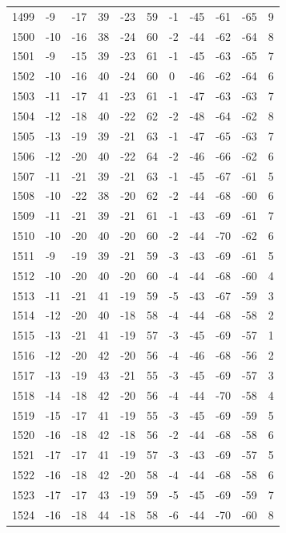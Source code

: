 \begin{table}[H]
\begin{tabular}{lllllllllll}
1499 & -9 & -17 & 39 & -23 & 59 & -1 & -45 & -61 & -65 & 9 \\
1500 & -10 & -16 & 38 & -24 & 60 & -2 & -44 & -62 & -64 & 8 \\
1501 & -9 & -15 & 39 & -23 & 61 & -1 & -45 & -63 & -65 & 7 \\
1502 & -10 & -16 & 40 & -24 & 60 & 0 & -46 & -62 & -64 & 6 \\
1503 & -11 & -17 & 41 & -23 & 61 & -1 & -47 & -63 & -63 & 7 \\
1504 & -12 & -18 & 40 & -22 & 62 & -2 & -48 & -64 & -62 & 8 \\
1505 & -13 & -19 & 39 & -21 & 63 & -1 & -47 & -65 & -63 & 7 \\
1506 & -12 & -20 & 40 & -22 & 64 & -2 & -46 & -66 & -62 & 6 \\
1507 & -11 & -21 & 39 & -21 & 63 & -1 & -45 & -67 & -61 & 5 \\
1508 & -10 & -22 & 38 & -20 & 62 & -2 & -44 & -68 & -60 & 6 \\
1509 & -11 & -21 & 39 & -21 & 61 & -1 & -43 & -69 & -61 & 7 \\
1510 & -10 & -20 & 40 & -20 & 60 & -2 & -44 & -70 & -62 & 6 \\
1511 & -9 & -19 & 39 & -21 & 59 & -3 & -43 & -69 & -61 & 5 \\
1512 & -10 & -20 & 40 & -20 & 60 & -4 & -44 & -68 & -60 & 4 \\
1513 & -11 & -21 & 41 & -19 & 59 & -5 & -43 & -67 & -59 & 3 \\
1514 & -12 & -20 & 40 & -18 & 58 & -4 & -44 & -68 & -58 & 2 \\
1515 & -13 & -21 & 41 & -19 & 57 & -3 & -45 & -69 & -57 & 1 \\
1516 & -12 & -20 & 42 & -20 & 56 & -4 & -46 & -68 & -56 & 2 \\
1517 & -13 & -19 & 43 & -21 & 55 & -3 & -45 & -69 & -57 & 3 \\
1518 & -14 & -18 & 42 & -20 & 56 & -4 & -44 & -70 & -58 & 4 \\
1519 & -15 & -17 & 41 & -19 & 55 & -3 & -45 & -69 & -59 & 5 \\
1520 & -16 & -18 & 42 & -18 & 56 & -2 & -44 & -68 & -58 & 6 \\
1521 & -17 & -17 & 41 & -19 & 57 & -3 & -43 & -69 & -57 & 5 \\
1522 & -16 & -18 & 42 & -20 & 58 & -4 & -44 & -68 & -58 & 6 \\
1523 & -17 & -17 & 43 & -19 & 59 & -5 & -45 & -69 & -59 & 7 \\
1524 & -16 & -18 & 44 & -18 & 58 & -6 & -44 & -70 & -60 & 8 \\

\end{tabular}
\end{table}
